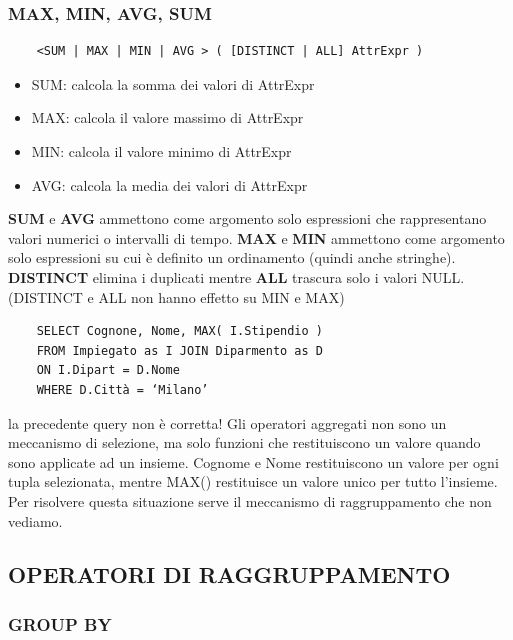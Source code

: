\documentclass[a4paper]{article}
\begin{document}
\subsubsection{MAX, MIN, AVG, SUM}

\begin{verbatim}
    <SUM | MAX | MIN | AVG > ( [DISTINCT | ALL] AttrExpr )
\end{verbatim}

\begin{itemize}
    \item SUM: calcola la somma dei valori di AttrExpr
    \item MAX: calcola il valore massimo di AttrExpr
    \item MIN: calcola il valore minimo di AttrExpr
    \item AVG: calcola la media dei valori di AttrExpr
\end{itemize}
\noindent
\textbf{SUM} e \textbf{AVG} ammettono come argomento solo espressioni che
rappresentano valori numerici o intervalli di tempo.
\textbf{MAX} e \textbf{MIN} ammettono come argomento solo espressioni su cui è
definito un ordinamento (quindi anche stringhe). \textbf{DISTINCT}
elimina i duplicati mentre \textbf{ALL} trascura solo i valori NULL. (DISTINCT e ALL non hanno effetto su MIN e MAX)
\begin{verbatim}
    SELECT Cognone, Nome, MAX( I.Stipendio )
    FROM Impiegato as I JOIN Diparmento as D
    ON I.Dipart = D.Nome
    WHERE D.Città = ‘Milano’
\end{verbatim}
\begin{Warning}{}{}
la precedente query non è corretta!
Gli operatori aggregati non sono un meccanismo di selezione, ma solo
funzioni che restituiscono un valore quando sono applicate ad un insieme.
Cognome e Nome restituiscono un valore per ogni tupla selezionata, mentre
MAX() restituisce un valore unico per tutto l’insieme. Per risolvere questa situazione serve il meccanismo di raggruppamento che
non vediamo.
\end{Warning}

\subsection{OPERATORI DI RAGGRUPPAMENTO}

\subsubsection{GROUP BY}
\end{document}
